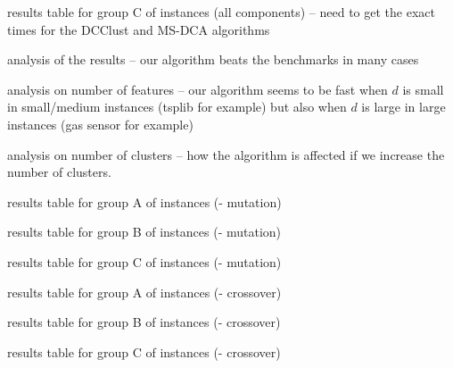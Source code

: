 
\noindent [TO-DO] results table for group C of instances (all components) -- need to get the exact times for the DCClust and MS-DCA algorithms

\noindent [TO-DO] analysis of the results -- our algorithm beats the benchmarks in many cases

\noindent [TO-DO] analysis on number of features -- our algorithm seems to be fast when $d$ is small in small/medium instances (tsplib for example) but also when $d$ is large in large instances (gas sensor for example)

\noindent [TO-DO] analysis on number of clusters -- how the algorithm is affected if we increase the number of clusters.

\noindent [TO-DO] results table for group A of instances (- mutation)

\noindent [TO-DO] results table for group B of instances (- mutation)

\noindent [TO-DO] results table for group C of instances (- mutation)

\noindent [TO-DO] results table for group A of instances (- crossover)

\noindent [TO-DO] results table for group B of instances (- crossover)

\noindent [TO-DO] results table for group C of instances (- crossover)